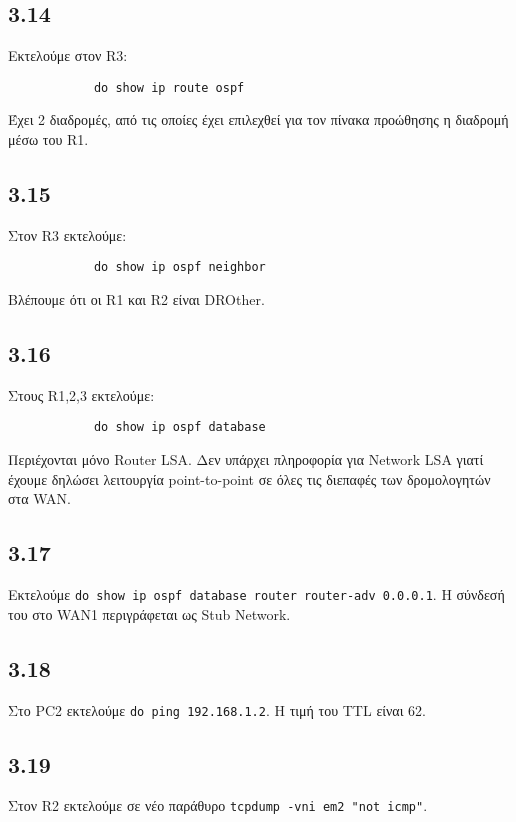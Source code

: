 \documentclass[a4paper, 12pt]{article}
\begin{document}
	\subsection*{3.14}
		Εκτελούμε στον R3:
		
		\begin{verbatim}
			do show ip route ospf
		\end{verbatim}
		
		Έχει 2 διαδρομές, από τις οποίες έχει επιλεχθεί για τον πίνακα προώθησης η διαδρομή μέσω του R1.

	\subsection*{3.15}
		Στον R3 εκτελούμε:
		
		\begin{verbatim}
			do show ip ospf neighbor
		\end{verbatim}
		
		Βλέπουμε ότι οι R1 και R2 είναι DROther.

	\subsection*{3.16}
		Στους R1,2,3 εκτελούμε:
		
		\begin{verbatim}
			do show ip ospf database
		\end{verbatim}
		
		Περιέχονται μόνο Router LSA. Δεν υπάρχει πληροφορία για Network LSA γιατί έχουμε δηλώσει λειτουργία point-to-point σε όλες τις διεπαφές των δρομολογητών στα WAN.

	\subsection*{3.17}
		Εκτελούμε \verb|do show ip ospf database router router-adv 0.0.0.1|. Η σύνδεσή του στο WAN1 περιγράφεται ως Stub Network.

	\subsection*{3.18}
		Στο PC2 εκτελούμε \verb|do ping 192.168.1.2|. Η τιμή του TTL είναι 62.

	\subsection*{3.19}
		Στον R2 εκτελούμε σε νέο παράθυρο \verb|tcpdump -vni em2 "not icmp"|.
\end{document}
